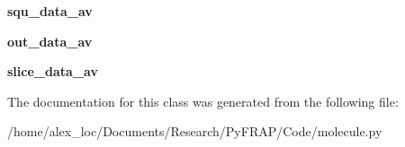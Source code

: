 \begin{DoxyCompactItemize}
\item 
\hypertarget{classmolecule_1_1molecule_a864413aa42cd12d5f931688962f4c370}{{\bfseries squ\+\_\+data\+\_\+av}}\label{classmolecule_1_1molecule_a864413aa42cd12d5f931688962f4c370}

\item 
\hypertarget{classmolecule_1_1molecule_a13eee198edcda996f770512709ce9951}{{\bfseries out\+\_\+data\+\_\+av}}\label{classmolecule_1_1molecule_a13eee198edcda996f770512709ce9951}

\item 
\hypertarget{classmolecule_1_1molecule_a1e38bdd1148364af0be6f6c2c36735f7}{{\bfseries slice\+\_\+data\+\_\+av}}\label{classmolecule_1_1molecule_a1e38bdd1148364af0be6f6c2c36735f7}

\end{DoxyCompactItemize}


The documentation for this class was generated from the following file\+:\begin{DoxyCompactItemize}
\item 
/home/alex\+\_\+loc/\+Documents/\+Research/\+Py\+F\+R\+A\+P/\+Code/molecule.\+py\end{DoxyCompactItemize}
